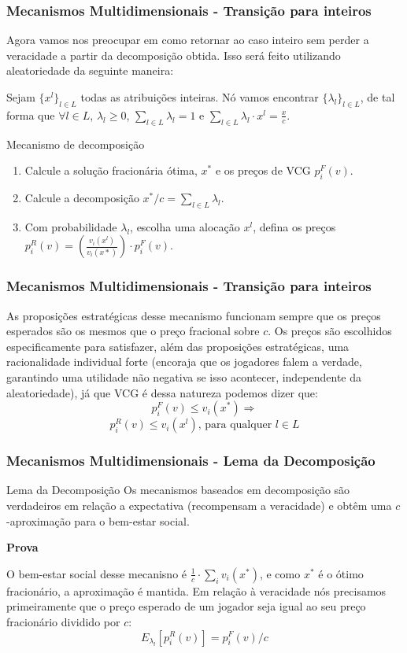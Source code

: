 \documentclass{beamer}
\begin{document}
\begin{frame}
    \frametitle{Mecanismos Multidimensionais - Transição para inteiros}
    Agora vamos nos preocupar em como retornar ao caso inteiro sem perder a veracidade a partir da decomposição obtida. Isso será feito utilizando aleatoriedade da seguinte maneira:

    Sejam $\{x^l\}_{l \in L}$ todas as atribuições inteiras. Nó vamos encontrar $\{\lambda_l\}_{l \in L}$, de tal forma que $\forall l \in L$, $\lambda_l \geq 0$, $\sum_{l \in L} \lambda_l = 1$ e $\sum_{l \in L} \lambda_l \cdot x^l = \frac{x}{c}$.
    \begin{block}{Mecanismo de decomposição}
    \begin{enumerate}
        \item{Calcule a solução fracionária ótima, $x^*$ e os preços de VCG $p_i^F(v)$.}
        \item{Calcule a decomposição $x^*/c = \sum_{l \in L} \lambda_l$.}
        \item{Com probabilidade $\lambda_l$, escolha uma alocação $x^l$, defina os preços $p_i^R(v) = \left( \frac{v_i(x^l)}{v_i(x*)} \right) \cdot p_i^F(v)$.}
    \end{enumerate}
    \end{block}
\end{frame}

\begin{frame}
    \frametitle{Mecanismos Multidimensionais - Transição para inteiros}
    As proposições estratégicas desse mecanismo funcionam sempre que os preços esperados são os mesmos que o preço fracional sobre $c$. Os preços são escolhidos especificamente para satisfazer, além das proposições estratégicas, uma racionalidade individual forte (encoraja que os jogadores falem a verdade, garantindo uma utilidade não negativa se isso acontecer, independente da aleatoriedade), já que VCG é dessa natureza podemos dizer que:
    $$
        p_i^F(v) \leq v_i(x^*) \Rightarrow
    $$$$
        p_i^R(v) \leq v_i(x^l) \textrm{, para qualquer } l \in L
    $$
\end{frame}

\begin{frame}
    \frametitle{Mecanismos Multidimensionais - Lema da Decomposição}
    \begin{block}{Lema da Decomposição}
        Os mecanismos baseados em decomposição são verdadeiros em relação a expectativa (recompensam a veracidade) e obtêm uma $c$-aproximação para o bem-estar social.
    \end{block}
    \textbf{Prova}

    O bem-estar social desse mecanisno é $\frac{1}{c} \cdot \sum_i v_i(x^*)$, e como $x^*$ é o ótimo fracionário, a aproximação é mantida.
    Em relação à veracidade nós precisamos primeiramente que o preço esperado de um jogador seja igual ao seu preço fracionário dividido por $c$:
    $$
        E_{\lambda_l}[p_i^R(v)] = p_i^F(v) / c
    $$
\end{frame}
\end{document}
